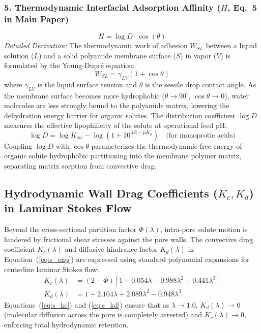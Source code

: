 \documentclass[11pt]{article}
\begin{document}
\subsubsection{5. Thermodynamic Interfacial Adsorption Affinity ($H$, Eq.~5 in Main Paper)}
\begin{equation}
H = \log D \cdot \cos(\theta)
\label{eq:s_h_affinity}
\end{equation}
\noindent\textit{Detailed Derivation:} The thermodynamic work of adhesion $W_{SL}$ between a liquid solution ($L$) and a solid polyamide membrane surface ($S$) in vapor ($V$) is formulated by the Young-Dupr\'e equation:
\begin{equation}
W_{SL} = \gamma_{LV} (1 + \cos\theta)
\label{eq:s_young_dupre}
\end{equation}
where $\gamma_{LV}$ is the liquid surface tension and $\theta$ is the sessile drop contact angle. As the membrane surface becomes more hydrophobic ($\theta \to 90^\circ$, $\cos\theta \to 0$), water molecules are less strongly bound to the polyamide matrix, lowering the dehydration energy barrier for organic solutes. The distribution coefficient $\log D$ measures the effective lipophilicity of the solute at operational feed pH:
\begin{equation}
\log D = \log K_{ow} - \log\left( 1 + 10^{\mathrm{pH} - \mathrm{p}K_a} \right) \quad \text{(for monoprotic acids)}
\label{eq:s_logd_def}
\end{equation}
Coupling $\log D$ with $\cos\theta$ parameterizes the thermodynamic free energy of organic solute hydrophobic partitioning into the membrane polymer matrix, separating matrix sorption from convective drag.

\subsection{Hydrodynamic Wall Drag Coefficients ($K_c, K_d$) in Laminar Stokes Flow}
\label{sec:ferry_renkin_drag}
Beyond the cross-sectional partition factor $\Phi(\lambda)$, intra-pore solute motion is hindered by frictional shear stresses against the pore walls. The convective drag coefficient $K_c(\lambda)$ and diffusive hindrance factor $K_d(\lambda)$ in Equation~(\ref{eq:s_enp}) are expressed using standard polynomial expansions for centerline laminar Stokes flow:
\begin{align}
K_c(\lambda) &= (2 - \Phi) \left[ 1 + 0.054 \lambda - 0.988 \lambda^2 + 0.441 \lambda^3 \right] \label{eq:s_kc} \\
K_d(\lambda) &= 1 - 2.104 \lambda + 2.089 \lambda^2 - 0.948 \lambda^3 \label{eq:s_kd}
\end{align}
Equations~(\ref{eq:s_kc}) and (\ref{eq:s_kd}) ensure that as $\lambda \to 1.0$, $K_d(\lambda) \to 0$ (molecular diffusion across the pore is completely arrested) and $K_c(\lambda) \to 0$, enforcing total hydrodynamic retention.
\end{document}
